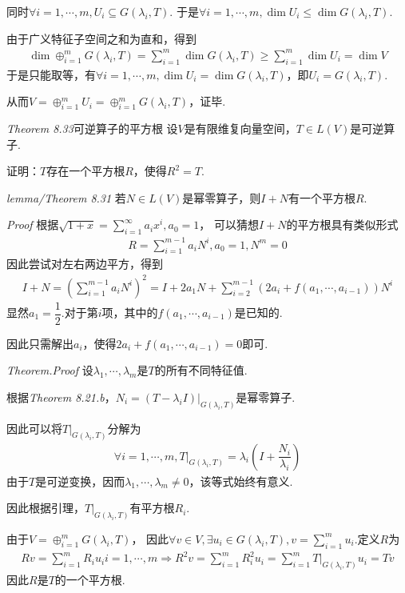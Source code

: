 同时\(\forall i=1,\cdots,m,U_i \subseteq G(\lambda_i,T)\).
于是\(\forall i=1,\cdots,m,\dim U_i \leq \dim G(\lambda_i,T)\).

由于广义特征子空间之和为直和，得到
    \begin{align*}
        \dim \oplus_{i=1}^m G(\lambda_i,T)=\sum_{i=1}^m \dim G(\lambda_i,T) \geq \sum_{i=1}^m \dim U_i=\dim V
    \end{align*}
于是只能取等，有\(\forall i=1,\cdots,m,\dim U_i=\dim G(\lambda_i,T)\)，即\(U_i=G(\lambda_i,T)\).

从而\(V=\oplus_{i=1}^m U_i=\oplus_{i=1}^m G(\lambda_i,T)\)，证毕.

\newpage

\textit{Theorem 8.33}{\kaishu 可逆算子的平方根}
设\(V\)是有限维复向量空间，\(T \in L(V)\)是可逆算子.

证明：\(T\)存在一个平方根\(R\)，使得\(R^2=T\).

\textit{lemma/Theorem 8.31}
若\(N \in L(V)\)是幂零算子，则\(I+N\)有一个平方根\(R\).

\textit{Proof}
根据\(\sqrt{1+x}=\sum_{i=1}^\infty a_ix^i,a_0=1\)，
可以猜想\(I+N\)的平方根具有类似形式
    \begin{align*}
        R=\sum_{i=1}^{m-1} a_iN^i,a_0=1,N^m=0
    \end{align*}
因此尝试对左右两边平方，得到
    \begin{align*}
        I+N = (\sum_{i=1}^{m-1} a_iN^i)^2 
            = I+2a_1N+\sum_{i=2}^{m-1} (2a_i+f(a_1,\cdots,a_{i-1}))N^i
    \end{align*}
显然\(a_1=\dfrac{1}{2}\).对于第\(i\)项，其中的\(f(a_1,\cdots,a_{i-1})\)是已知的.

因此只需解出\(a_i\)，使得\(2a_i+f(a_1,\cdots,a_{i-1})=0\)即可.

\textit{Theorem.Proof}
设\(\lambda_1,\cdots,\lambda_m\)是\(T\)的所有不同特征值.

根据\textit{Theorem 8.21.b}，\(N_i=(T-\lambda_i I)|_{G(\lambda_i,T)}\)是幂零算子.

因此可以将\(T|_{G(\lambda_i,T)}\)分解为
    \begin{align*}
        \forall i=1,\cdots,m,T|_{G(\lambda_i,T)}=\lambda_i(I+\dfrac{N_i}{\lambda_i})
    \end{align*}
由于\(T\)是可逆变换，因而\(\lambda_1,\cdots,\lambda_m \ne 0\)，该等式始终有意义.

因此根据引理，\(T|_{G(\lambda_i,T)}\)有平方根\(R_i\).

由于\(V=\oplus_{i=1}^m G(\lambda_i,T)\)，
因此\(\forall v \in V,\exists u_i \in G(\lambda_i,T),v=\sum_{i=1}^m u_i\).定义\(R\)为
    \begin{align*}
        Rv=\sum_{i=1}^m R_iu_i i=1,\cdots,m \Rightarrow
        R^2v=\sum_{i=1}^m R_i^2 u_i=\sum_{i=1}^m T|_{G(\lambda_i,T)}u_i=Tv
    \end{align*}
因此\(R\)是\(T\)的一个平方根.

